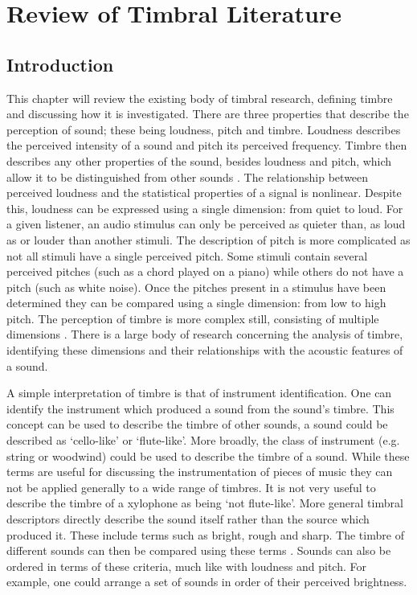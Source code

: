 
\chapter{Review of Timbral Literature}
\label{chap:Timbre}

\section{Introduction}
\label{sec:Timbre-Introduction}
	This chapter will review the existing body of timbral research, defining timbre and discussing how it is
	investigated. There are three properties that describe the perception of sound; these being loudness, pitch and
	timbre.  Loudness describes the perceived intensity of a sound and pitch its perceived frequency. Timbre then
	describes any other properties of the sound, besides loudness and pitch, which allow it to be distinguished from
	other sounds \citep{mathews1999introduction}. The relationship between perceived loudness and the statistical
	properties of a signal is nonlinear. Despite this, loudness can be expressed using a single dimension: from quiet
	to loud. For a given listener, an audio stimulus can only be perceived as quieter than, as loud as or louder than
	another stimuli. The description of pitch is more complicated as not all stimuli have a single perceived pitch.
	Some stimuli contain several perceived pitches (such as a chord played on a piano) while others do not have a pitch
	(such as white noise). Once the pitches present in a stimulus have been determined they can be compared using a
	single dimension: from low to high pitch. The perception of timbre is more complex still, consisting of multiple
	dimensions \citep{rossing2002the}. There is a large body of research concerning the analysis of timbre, identifying
	these dimensions and their relationships with the acoustic features of a sound.

	A simple interpretation of timbre is that of instrument identification. One can identify the instrument which
	produced a sound from the sound's timbre. This concept can be used to describe the timbre of other sounds, a sound
	could be described as `cello-like' or `flute-like'. More broadly, the class of instrument (e.g. string or woodwind)
	could be used to describe the timbre of a sound. While these terms are useful for discussing the instrumentation of
	pieces of music they can not be applied generally to a wide range of timbres. It is not very useful to describe the
	timbre of a xylophone as being `not flute-like'. More general timbral descriptors directly describe the sound
	itself rather than the source which produced it. These include terms such as bright, rough and sharp. The timbre of
	different sounds can then be compared using these terms \citep{howard2009acoustics}. Sounds can also be ordered in
	terms of these criteria, much like with loudness and pitch. For example, one could arrange a set of sounds in order
	of their perceived brightness.

